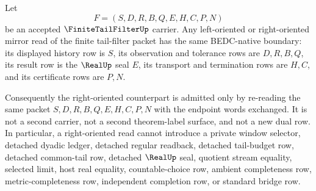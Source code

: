 \begin{theorem}
\label{thm:finite-tail-filter-left-right-mirror-boundary}
Let
$$
F=(S,D,R,B,Q,E,H,C,P,N)
$$
be an accepted $\FiniteTailFilterUp$ carrier. Any left-oriented or right-oriented mirror read of the finite tail-filter packet has the same BEDC-native boundary: its displayed history row is $S$, its observation and tolerance rows are $D,R,B,Q$, its result row is the $\RealUp$ seal $E$, its transport and termination rows are $H,C$, and its certificate rows are $P,N$.

Consequently the right-oriented counterpart is admitted only by re-reading the same packet $S,D,R,B,Q,E,H,C,P,N$ with the endpoint words exchanged. It is not a second carrier, not a second theorem-label surface, and not a new dual row. In particular, a right-oriented read cannot introduce a private window selector, detached dyadic ledger, detached regular readback, detached tail-budget row, detached common-tail row, detached $\RealUp$ seal, quotient stream equality, selected limit, host real equality, countable-choice row, ambient completeness row, metric-completeness row, independent completion row, or standard bridge row.
\end{theorem}
